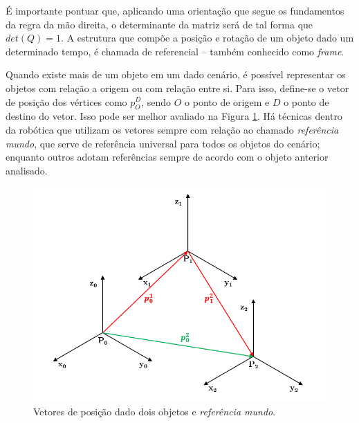 É importante pontuar que, aplicando uma orientação que segue os fundamentos da regra da mão direita, o determinante da matriz será de tal forma que $det(Q) = 1$. A estrutura que compõe a posição e rotação de um objeto dado um determinado tempo, é chamada de referencial – também conhecido como \textit{frame}.


Quando existe mais de um objeto em um dado cenário, é possível representar os objetos com relação a origem ou com relação entre si. Para isso, define-se o vetor de posição dos vértices como $p_O^D$, sendo $O$ o ponto de origem e $D$ o ponto de destino do vetor. Isso pode ser melhor avaliado na Figura \ref{fig:DoisPontos}. Há técnicas dentro da robótica que utilizam os vetores sempre com relação ao chamado \textit{referência mundo}, que serve de referência universal para todos os objetos do cenário; enquanto outros adotam referências sempre de acordo com o objeto anterior analisado.

\begin{figure}[h!]
\centering
\includegraphics[width=0.7\columnwidth]{Imagens/DoisPontos.PNG}
\caption{Vetores de posição dado dois objetos e \textit{referência mundo}.}
\label{fig:DoisPontos}
\end{figure}


